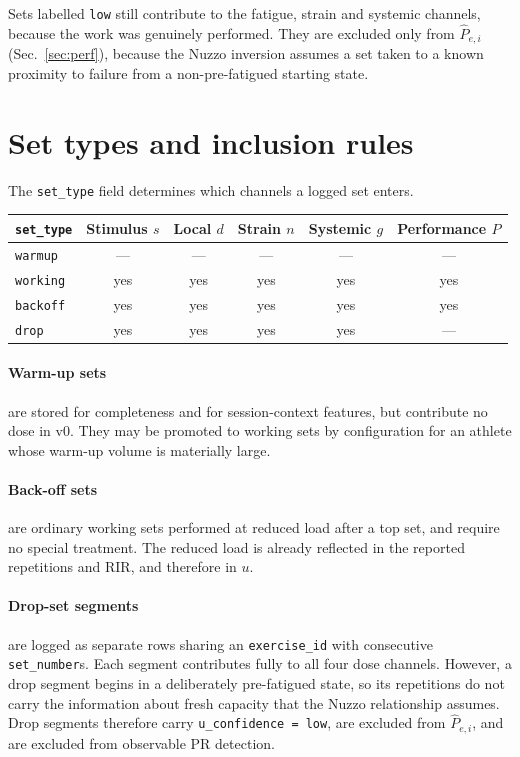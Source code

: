 \documentclass[11pt]{article}
\begin{document}
Sets labelled \texttt{low} still contribute to the fatigue, strain and systemic channels, because the work was genuinely performed. They are excluded only from $\widehat P_{e,i}$ (Sec.~\ref{sec:perf}), because the Nuzzo inversion assumes a set taken to a known proximity to failure from a non-pre-fatigued starting state.

\section{Set types and inclusion rules}

The \texttt{set\_type} field determines which channels a logged set enters.

\begin{center}
\begin{tabular}{lccccc}
\toprule
\texttt{set\_type} & Stimulus $s$ & Local $d$ & Strain $n$ & Systemic $g$ & Performance $\widehat P$ \\
\midrule
\texttt{warmup}  & --- & --- & --- & --- & --- \\
\texttt{working} & yes & yes & yes & yes & yes \\
\texttt{backoff} & yes & yes & yes & yes & yes \\
\texttt{drop}    & yes & yes & yes & yes & --- \\
\bottomrule
\end{tabular}
\end{center}

\paragraph{Warm-up sets} are stored for completeness and for session-context features, but contribute no dose in v0. They may be promoted to working sets by configuration for an athlete whose warm-up volume is materially large.

\paragraph{Back-off sets} are ordinary working sets performed at reduced load after a top set, and require no special treatment. The reduced load is already reflected in the reported repetitions and RIR, and therefore in $u$.

\paragraph{Drop-set segments} are logged as separate rows sharing an \texttt{exercise\_id} with consecutive \texttt{set\_number}s. Each segment contributes fully to all four dose channels. However, a drop segment begins in a deliberately pre-fatigued state, so its repetitions do not carry the information about fresh capacity that the Nuzzo relationship assumes. Drop segments therefore carry \texttt{u\_confidence = low}, are excluded from $\widehat P_{e,i}$, and are excluded from observable PR detection.
\end{document}
